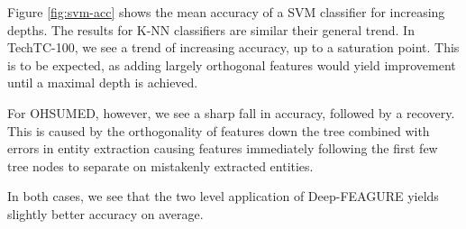\documentclass[twoside,11pt]{article}
\theoremstyle{definition}
\begin{document}
Figure \ref{fig:svm-acc} shows the mean accuracy of a SVM classifier for increasing depths. The results for K-NN classifiers are similar their general trend. In TechTC-100, we see a trend of increasing accuracy, up to a saturation point. This is to be expected, as adding largely orthogonal features would yield improvement until a maximal depth is achieved.

For OHSUMED, however, we see a sharp fall in accuracy, followed by a recovery. 
This is caused by the orthogonality of features down the tree combined with errors in entity extraction causing features immediately following the first few tree nodes to separate on mistakenly extracted entities.

In both cases, we see that the two level application of Deep-FEAGURE yields slightly better accuracy on average.




\end{document}
